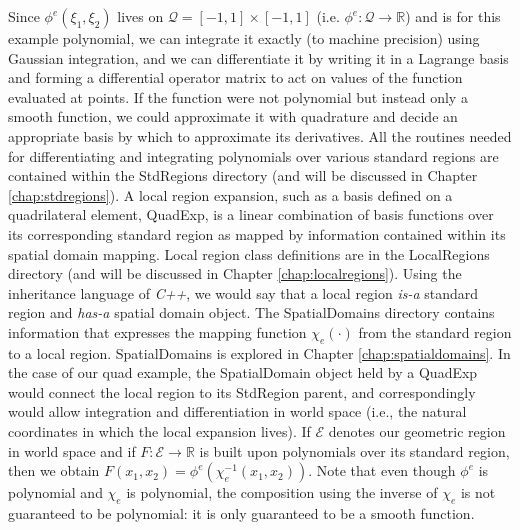 Since $\phi^e(\xi_1,\xi_2)$ lives on ${\mathcal Q} = [-1,1] \times [-1,1]$ (i.e. $\phi^e:{\mathcal Q}\rightarrow\mathbb{R}$) and is for this example polynomial, we can integrate it exactly (to machine precision) using Gaussian integration, and we can differentiate it by writing it in a Lagrange basis and forming a differential operator matrix to act on values of the function evaluated at points.   If the function were not polynomial but instead only a smooth function, we could approximate it with quadrature and decide an appropriate basis by which to 
approximate its derivatives.  All the routines needed for differentiating and integrating polynomials over various standard regions are contained within the StdRegions 
directory (and will be discussed in Chapter \ref{chap:stdregions}).   A local region expansion, such as a basis defined on a quadrilateral element, QuadExp, is a linear combination of basis functions over its corresponding standard region as mapped by
information contained within its spatial domain mapping.  Local region class definitions are in the LocalRegions directory (and will be discussed in Chapter \ref{chap:localregions}).  Using the inheritance language of {\em C++}, we would say that a local region {\em is-a} standard region and
{\em has-a} spatial domain object.  The SpatialDomains directory contains information that expresses the mapping function $\chi_e(\cdot)$ from the standard region
to a local region.  SpatialDomains is explored in Chapter \ref{chap:spatialdomains}.  In the case of our quad example, the SpatialDomain object held by a QuadExp would connect the local region to its StdRegion parent,
and correspondingly would allow integration and differentiation in world space (i.e., the natural coordinates in which the local expansion lives).  If ${\mathcal E}$ denotes our
geometric region in world space and if $F:{\mathcal E}\rightarrow\mathbb{R}$ is built upon polynomials over its standard region, then we obtain $F(x_1,x_2) = \phi^e(\chi_e^{-1}(x_1,x_2))$.  Note that even though $\phi^e$ is polynomial and $\chi_e$ is polynomial, the composition using the inverse of $\chi_e$ is not guaranteed to be polynomial: it is only
guaranteed to be a smooth function. 

